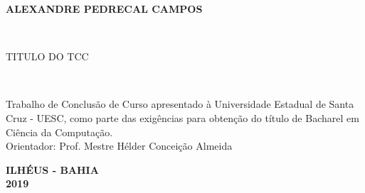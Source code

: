 
\begin{center}

    {\large \begin{large} \bfseries ALEXANDRE PEDRECAL CAMPOS \end{large}\\}
    \vspace{8cm}
    {\large\bfseries{\begin{large}TITULO DO TCC\end{large}}\\}
    \vspace{1cm}
    \hspace{.45\linewidth}
    \begin{minipage}{.50\linewidth}
            Trabalho de Conclusão de Curso apresentado à Universidade Estadual de Santa Cruz - UESC, como parte das exigências para obtenção do título de Bacharel em Ciência da Computação.
            \\ Orientador: Prof. Mestre Hélder Conceição Almeida


    \end{minipage}

    \vspace{2cm}
    \vfill
    {\large\bfseries{ ILHÉUS - BAHIA \\ 2019}}
\end{center}

